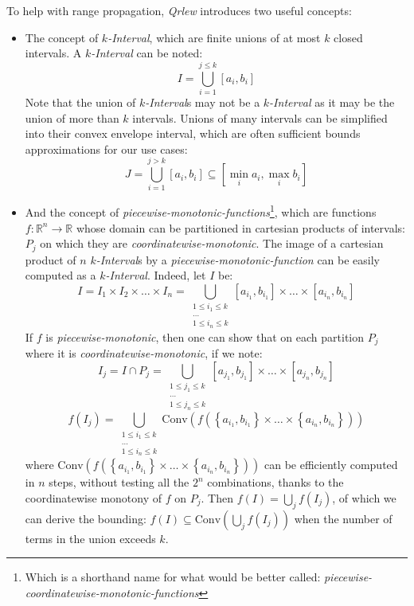 \documentclass[letterpaper]{article} %
\newcommand{\qrlew}{\emph{Qrlew}}
\begin{document}
To help with range propagation, \qrlew{} introduces two useful concepts:
\begin{itemize}
    \item The concept of \emph{$k$-Interval}, which are finite unions of at most $k$ closed intervals. A \emph{$k$-Interval} can be noted:
    $$I = \bigcup_{i=1}^{j\leq k}\left[a_i, b_i\right]$$
    Note that the union of \emph{$k$-Interval}s may not be a \emph{$k$-Interval} as it may be the union of more than $k$ intervals.
    Unions of many intervals can be simplified into their convex envelope interval, which are often sufficient bounds approximations for our use cases:
    $$J = \bigcup_{i=1}^{j> k}\left[a_i, b_i\right] \subseteq \left[\min_i a_i, \max_i b_i\right]$$
    \item And the concept of \emph{piecewise-monotonic-functions}\footnote{Which is a shorthand name for what would be better called: \emph{piecewise-coordinatewise-monotonic-functions}}, which are functions $f: \mathbb{R}^n \rightarrow \mathbb{R}$ whose domain can be partitioned in cartesian products of intervals: $P_j$ on which they are \emph{coordinatewise-monotonic}.
    The image of a cartesian product of $n$ \emph{$k$-Interval}s by a \emph{piecewise-monotonic-function} can be easily computed as a \emph{$k$-Interval}.
    Indeed, let $I$ be:
    $$I = I_1\times I_2\times \ldots \times I_n = \bigcup_{\substack{1\leq i_1\leq k\\\ldots\\1\leq i_n\leq k}}\left[a_{i_1}, b_{i_1}\right]\times \ldots \times \left[a_{i_n}, b_{i_n}\right]$$
    If $f$ is \emph{piecewise-monotonic}, then one can show that on each partition $P_j$ where it is \emph{coordinatewise-monotonic}, if we note:
    $$I_j = I \cap P_j = \bigcup_{\substack{1\leq j_1\leq k\\\ldots\\1\leq j_n\leq k}}\left[a_{j_1}, b_{j_1}\right]\times \ldots \times \left[a_{j_n}, b_{j_n}\right]$$
    $$f(I_j) = \bigcup_{\substack{1\leq i_1\leq k\\\ldots\\1\leq i_n\leq k}}\text{Conv}\left(f\left( \left\{a_{i_1}, b_{i_1}\right\}\times \ldots \times \left\{a_{i_n}, b_{i_n}\right\}\right)\right)$$
    where $\text{Conv}\left(f\left( \left\{a_{i_1}, b_{i_1}\right\}\times \ldots \times \left\{a_{i_n}, b_{i_n}\right\}\right)\right)$ can be efficiently computed in $n$ steps, without testing all the $2^n$ combinations, thanks to the coordinatewise monotony of $f$ on $P_j$.
    Then $f(I) = \bigcup_j f(I_j)$, of which we can derive the bounding: $f(I) \subseteq \text{Conv}\left(\bigcup_j f(I_j)\right)$ when the number of terms in the union exceeds $k$.
\end{itemize}
\end{document}
